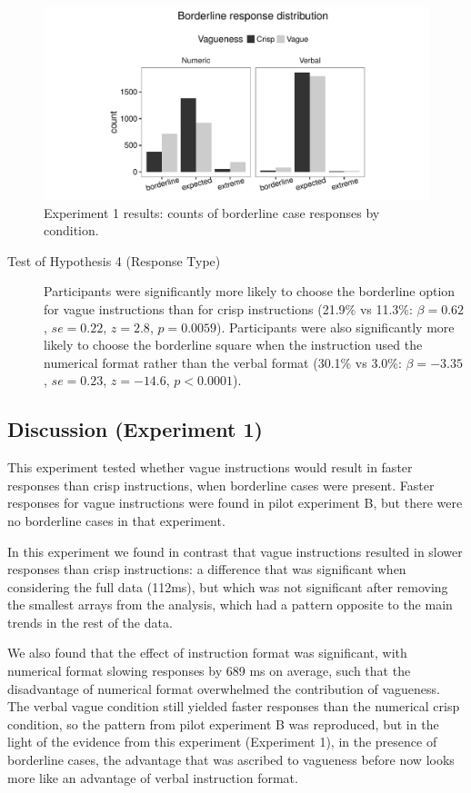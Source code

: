 \begin{figure}[htbp]
\centering
\includegraphics[width=\textwidth]{figures/Ce1-blBarChart-1}
\caption{Experiment 1 results: counts of borderline case responses by condition.}
\label{resultsC-exp-1-BL}
\end{figure}

\begin{description}
	\item [Test of Hypothesis 4 (Response Type)] Participants were significantly more likely to choose the borderline option for vague instructions than for crisp instructions (21.9\% vs 11.3\%: $\beta=0.62$, $se=0.22$, $z=2.8$, $p=0.0059$). Participants were also significantly more likely to choose the borderline square when the instruction used the numerical format rather than the verbal format (30.1\% vs 3.0\%: $\beta=-3.35$, $se=0.23$, $z=-14.6$, $p<0.0001$). 
\end{description}

\subsection{Discussion (Experiment 1)}

This experiment tested whether vague instructions would result in faster responses than crisp instructions, when borderline cases were present. Faster responses for vague instructions were found in pilot experiment B, but there were no borderline cases in that experiment.

In this experiment we found in contrast that vague instructions resulted in slower responses than crisp instructions: a difference that was significant when considering the full data (112ms), but which was not significant after removing the smallest arrays from the analysis, which had a pattern opposite to the main trends in the rest of the data.

We also found that the effect of instruction format was significant, with numerical format slowing responses by 689 ms on average, such that the disadvantage of numerical format overwhelmed the contribution of vagueness. The verbal vague condition still yielded faster responses than the numerical crisp condition, so the pattern from pilot experiment B was reproduced, but in the light of the evidence from this experiment (Experiment 1), in the presence of borderline cases, the advantage that was ascribed to vagueness before now looks more like an advantage of verbal instruction format.


